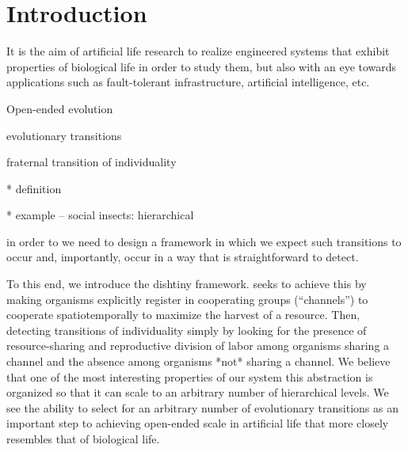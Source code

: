 \section{Introduction}

It is the aim of artificial life research to realize engineered systems that exhibit properties of biological life in order to study them, but also with an eye towards applications such as fault-tolerant infrastructure, artificial intelligence, etc.


Open-ended evolution

evolutionary transitions

fraternal transition of individuality

* definition

* example -- social insects: hierarchical

in order to we need to design a framework in which we expect such transitions to occur and, importantly, occur in a way that is straightforward to detect.

To this end, we introduce the dishtiny framework.
seeks to achieve this by making organisms explicitly register in cooperating groups (``channels'') to cooperate spatiotemporally to maximize the harvest of a resource.
Then, detecting transitions of individuality simply by looking for the presence of resource-sharing and reproductive division of labor among organisms sharing a channel and the absence among organisms *not* sharing a channel.
We believe that one of the most interesting properties of our system this abstraction is organized so that it can scale to an arbitrary number of hierarchical levels.
We see the ability to select for an arbitrary number of evolutionary transitions as an important step to achieving open-ended scale in artificial life that more closely resembles that of biological life.
